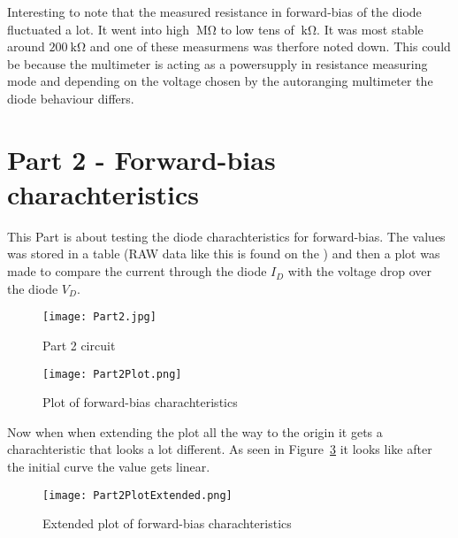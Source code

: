 \documentclass{article}
\begin{document}
Interesting to note that the measured resistance in forward-bias of the diode fluctuated a lot. It went into high \(\SI{}{\mega\ohm}\) to low tens of \(\SI{}{\kilo\ohm}\). It was most stable around \(\SI{200}{\kilo\ohm}\) and one of these measurmens was therfore noted down. This could be because the multimeter is acting as a powersupply in resistance measuring mode and depending on the voltage chosen by the autoranging multimeter the diode behaviour differs.


\section{Part 2 - Forward-bias charachteristics}
This Part is about testing the diode charachteristics for forward-bias. The values was stored in a table (RAW data like this is found on the ) and then a plot was made to compare the current through the diode \(I_D\) with the voltage drop over the diode \(V_D\).


\begin{figure}[h]
    \centering
    \texttt{[image: Part2.jpg]}
    \caption{Part 2 circuit}
    \label{fig:Part2}
\end{figure}

\clearpage


\begin{figure}[h]
    \centering
    \texttt{[image: Part2Plot.png]}
    \caption{Plot of forward-bias charachteristics}
    \label{fig:Part2Plot}
\end{figure}

Now when when extending the plot all the way to the origin it gets a charachteristic that looks a lot different. As seen in Figure~\ref{fig:Part2PlotExtended} it looks like after the initial curve the value gets linear.

\clearpage


\begin{figure}[h]
    \centering
    \texttt{[image: Part2PlotExtended.png]}
    \caption{Extended plot of forward-bias charachteristics}
    \label{fig:Part2PlotExtended}
\end{figure}
\end{document}
